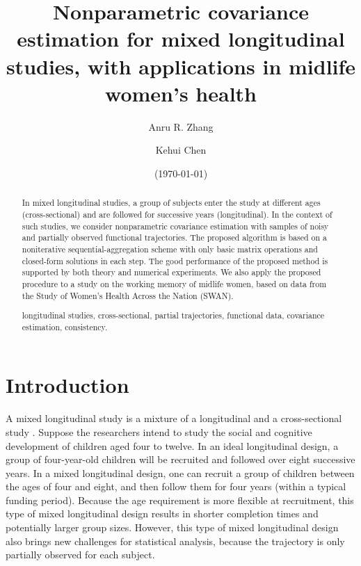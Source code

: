 \documentclass[11pt]{article}
\newcommand{\0}{{\mathbf{0}}}
\newcommand{\1}{{\mathbf{1}}}
\begin{document}
\title{Nonparametric covariance estimation for mixed longitudinal studies, with applications in midlife women's health}

\date{(\today)}

\author[1,2]{Anru R. Zhang} 
\author[3]{Kehui Chen}
\maketitle
\bigskip

\begin{abstract}
	In mixed longitudinal studies, a group of subjects enter the study at different ages (cross-sectional) and are followed for successive years (longitudinal). In the context of such studies, we consider nonparametric covariance estimation with samples of noisy and partially observed functional trajectories. The proposed algorithm is based on a noniterative sequential-aggregation scheme with only basic matrix operations and closed-form solutions in each step. The good performance of the proposed method is supported by both theory and numerical experiments. We also apply the proposed procedure to a study on the working memory of midlife women, based on data from the Study of Women's Health Across the Nation (SWAN).

 longitudinal studies, cross-sectional, partial trajectories, functional data, covariance estimation, consistency.
\end{abstract}

\section{Introduction}

A mixed longitudinal study is a mixture of a longitudinal and a cross-sectional study \citep{berger1986comparison, helms1992intentionally}. Suppose the researchers intend to study the social and cognitive development of children aged four to twelve. In an ideal longitudinal design, a group of four-year-old children will be recruited and followed over eight successive years. In a mixed longitudinal design, one can recruit a group of children between the ages of four and eight, and then follow them for four years (within a typical funding period). Because the age requirement is more flexible at recruitment, this type of mixed longitudinal design results in shorter completion times and potentially larger group sizes.  
However, this type of mixed longitudinal design also brings new challenges for statistical analysis, because the trajectory is only partially observed for each subject.
\end{document}
